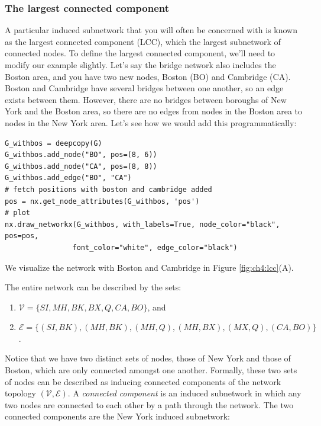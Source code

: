 \subsubsection{The largest connected component}
\label{sec:ch4:prop-net:lcc}

A particular induced subnetwork that you will often be concerned with is known as the largest connected component (LCC), which the largest subnetwork of connected nodes. To define the largest connected component, we'll need to modify our example slightly. Let's say the bridge network also includes the Boston area, and you have two new nodes, Boston (BO) and Cambridge (CA). Boston and Cambridge have several bridges between one another, so an edge exists between them. However, there are no bridges between boroughs of New York and the Boston area, so there are no edges from nodes in the Boston area to nodes in the New York area. Let's see how we would add this programmatically:

\begin{lstlisting}[style=python]
G_withbos = deepcopy(G)
G_withbos.add_node("BO", pos=(8, 6))
G_withbos.add_node("CA", pos=(8, 8))
G_withbos.add_edge("BO", "CA")
# fetch positions with boston and cambridge added
pos = nx.get_node_attributes(G_withbos, 'pos')
# plot
nx.draw_networkx(G_withbos, with_labels=True, node_color="black", pos=pos,
                font_color="white", edge_color="black")
\end{lstlisting}

We visualize the network with Boston and Cambridge in Figure \ref{fig:ch4:lcc}(A). 

The entire network can be described by the sets:
\begin{enumerate}
    \item $\mathcal V = \{SI, MH, BK, BX, Q, CA, BO\}$, and
    \item $\mathcal E = \{(SI, BK), (MH, BK), (MH, Q), (MH, BX), (MX, Q), (CA, BO)\}$.
\end{enumerate}

Notice that we have two distinct sets of nodes, those of New York and those of Boston, which are {only} connected amongst one another. Formally, these two sets of nodes can be described as inducing {connected components} of the network topology $(\mathcal V, \mathcal E)$. A \textit{connected component} is an induced subnetwork in which any two nodes are connected to each other by a path through the network. The two connected components are the New York induced subnetwork:

